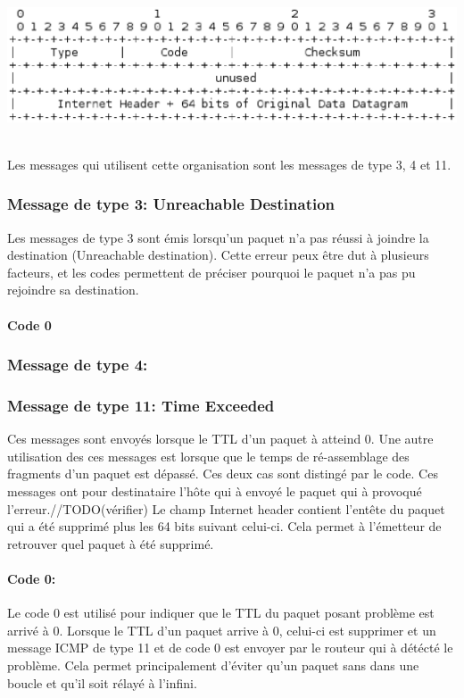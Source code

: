 \documentclass[twoside,openright,a4paper,11pt,french]{article}
\begin{document}
\includegraphics[width=15cm]{./pics/header1.eps}

\\Les messages qui utilisent cette organisation sont les messages de type 3, 4 et 11.

\subsubsection{Message de type 3: Unreachable Destination}
Les messages de type 3 sont émis lorsqu'un paquet n'a pas réussi à joindre la destination (Unreachable destination). Cette erreur peux être dut à plusieurs facteurs, et les codes permettent de préciser pourquoi le paquet n'a pas pu rejoindre sa destination.
\paragraph{Code 0}

\subsubsection{Message de type 4:}

\subsubsection{Message de type 11: Time Exceeded}
Ces messages sont envoyés lorsque le TTL d'un paquet à atteind 0. Une autre utilisation des ces messages est lorsque que le temps de ré-assemblage des fragments d'un paquet est dépassé. Ces deux cas sont distingé par le code. Ces messages ont pour destinataire l'hôte qui à envoyé le paquet qui à provoqué l'erreur.//TODO(vérifier)
Le champ Internet header contient l'entête du paquet qui a été supprimé plus les 64 bits suivant celui-ci. Cela permet à l'émetteur de retrouver quel paquet à été supprimé.
\paragraph{Code 0:}
Le code 0 est utilisé pour indiquer que le TTL du paquet posant problème est arrivé à 0. Lorsque le TTL d'un paquet arrive à 0, celui-ci est supprimer et un message ICMP de type 11 et de code 0 est envoyer par le routeur qui à détécté le problème. Cela permet principalement d'éviter qu'un paquet sans dans une boucle et qu'il soit rélayé à l'infini.
\end{document}
